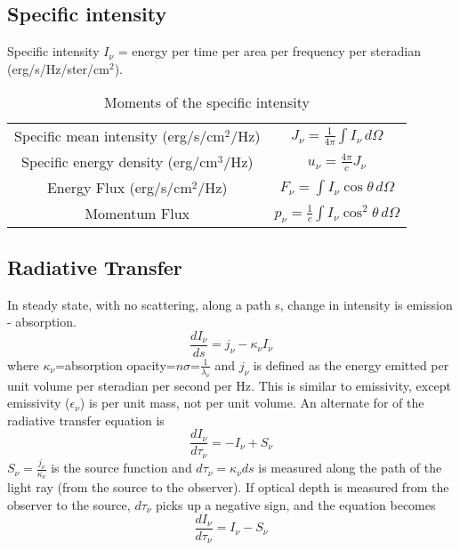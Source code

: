 \subsection{Specific intensity}
Specific intensity $I_{\nu}$ = energy per time per area per frequency per
steradian (erg/s/Hz/ster/cm$^2$).

\begin{table}[ht]
\begin{tabular}{cc}
\hline\hline
Specific mean intensity (erg/s/cm$^2$/Hz) &
    $J_{\nu}=\frac{1}{4\pi}\int I_{\nu}\,d\Omega$ \\
Specific energy density (erg/cm$^3$/Hz) &
    $u_{\nu}=\frac{4\pi}{c}J_{\nu}$ \\
Energy Flux (erg/s/cm$^2$/Hz) &
    $F_{\nu}=\int I_{\nu}\cos \theta\,d\Omega$ \\
Momentum Flux &
    $p_{\nu}=\frac{1}{c}\int I_{\nu}\cos^2 \theta\,d\Omega$ \\
\hline\hline
\end{tabular}
\caption{Moments of the specific intensity}
\end{table}

\subsection{Radiative Transfer}
In steady state, with no scattering, along a path s, change in intensity is emission - absorption.
\begin{dmath}\frac{dI_{\nu}}{ds}=j_{\nu}-\kappa_{\nu}I_{\nu}\end{dmath}
where $\kappa_{\nu}$=absorption opacity=$n\sigma$=$\frac{1}{\lambda_{\nu}}$ and $j_{\nu}$ is 
defined as the energy emitted per unit volume per steradian per second per Hz.  This is similar 
to emissivity, except emissivity ($\epsilon_{\nu}$) is per unit mass, not per unit volume.
An alternate for of the radiative transfer equation is 
\begin{dmath}\frac{dI_{\nu}}{d\tau_{\nu}}=-I_{\nu}+S_{\nu}\end{dmath}
$S_{\nu}=\frac{j_{\nu}}{\kappa_{\nu}}$ is the source function and $d\tau_{\nu}=\kappa_{\nu}ds$ 
is measured along the path of the light ray (from the source to the observer).  If optical depth 
is measured from the observer to the source, $d\tau_{\nu}$ picks up a negative sign, and the 
equation becomes
\begin{dmath}\frac{dI_{\nu}}{d\tau_{\nu}}=I_{\nu}-S_{\nu}\end{dmath}

